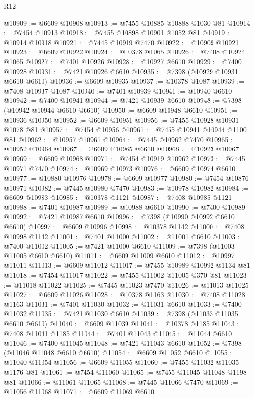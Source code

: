 \begin{lexlean}{R12}
\begin{coremodule}
{{{{{{{{{{{{{{{{{{{{{{{{{{{{{{{{{{{{{{{{{{{{{{{{{{{{{{{{{{{{{{{{{{{{{{{{{{{{{{{{{{@10909 := @6609 @10908
@10913 := @7455 @10885 @10888 @1030 @81
@10914 := @7454 @10913
@10918 := @7455 @10898 @10901 @1052 @81
@10919 := @10914 @10918
@10921 := @7445 @10919 @7470
@10922 := @10909 @10921
@10923 := @6609 @10922
@10924 := @10378 @1065
@10926 := @7408 @10924 @1065
@10927 := @7401 @10926
@10928 := @10927 @6610
@10929 := @7400 @10928
@10931 := @7421 @10926 @6610
@10935 := @7398 (@10929 @10931 @6610 @6610)
@10936 := @6609 @10935
@10937 := @10378 @1087
@10939 := @7408 @10937 @1087
@10940 := @7401 @10939
@10941 := @10940 @6610
@10942 := @7400 @10941
@10944 := @7421 @10939 @6610
@10948 := @7398 (@10942 @10944 @6610 @6610)
@10950 := @6609 @10948 @6610
@10951 := @10936 @10950
@10952 := @6609 @10951
@10956 := @7455 @10928 @10931 @1078 @81
@10957 := @7454 @10956
@10961 := @7455 @10941 @10944 @1100 @81
@10962 := @10957 @10961
@10964 := @7445 @10962 @7470
@10965 := @10952 @10964
@10967 := @6609 @10965 @6610
@10968 := @10923 @10967
@10969 := @6609 @10968
@10971 := @7454 @10919 @10962
@10973 := @7445 @10971 @7470
@10974 := @10969 @10973
@10976 := @6609 @10974 @6610
@10977 := @10880 @10976
@10978 := @6609 @10977
@10980 := @7454 @10876 @10971
@10982 := @7445 @10980 @7470
@10983 := @10978 @10982
@10984 := @6609 @10983
@10985 := @10378 @1121
@10987 := @7408 @10985 @1121
@10988 := @7401 @10987
@10989 := @10988 @6610
@10990 := @7400 @10989
@10992 := @7421 @10987 @6610
@10996 := @7398 (@10990 @10992 @6610 @6610)
@10997 := @6609 @10996
@10998 := @10378 @1142
@11000 := @7408 @10998 @1142
@11001 := @7401 @11000
@11002 := @11001 @6610
@11003 := @7400 @11002
@11005 := @7421 @11000 @6610
@11009 := @7398 (@11003 @11005 @6610 @6610)
@11011 := @6609 @11009 @6610
@11012 := @10997 @11011
@11013 := @6609 @11012
@11017 := @7455 @10989 @10992 @1134 @81
@11018 := @7454 @11017
@11022 := @7455 @11002 @11005 @370 @81
@11023 := @11018 @11022
@11025 := @7445 @11023 @7470
@11026 := @11013 @11025
@11027 := @6609 @11026
@11028 := @10378 @1163
@11030 := @7408 @11028 @1163
@11031 := @7401 @11030
@11032 := @11031 @6610
@11033 := @7400 @11032
@11035 := @7421 @11030 @6610
@11039 := @7398 (@11033 @11035 @6610 @6610)
@11040 := @6609 @11039
@11041 := @10378 @1185
@11043 := @7408 @11041 @1185
@11044 := @7401 @11043
@11045 := @11044 @6610
@11046 := @7400 @11045
@11048 := @7421 @11043 @6610
@11052 := @7398 (@11046 @11048 @6610 @6610)
@11054 := @6609 @11052 @6610
@11055 := @11040 @11054
@11056 := @6609 @11055
@11060 := @7455 @11032 @11035 @1176 @81
@11061 := @7454 @11060
@11065 := @7455 @11045 @11048 @1198 @81
@11066 := @11061 @11065
@11068 := @7445 @11066 @7470
@11069 := @11056 @11068
@11071 := @6609 @11069 @6610
}}}}}}}}}}}}}}}}}}}}}}}}}}}}}}}}}}}}}}}}}}}}}}}}}}}}}}}}}}}}}}}}}}}}}}}}}}}}}}}}}}
\end{coremodule}
\end{lexlean}
